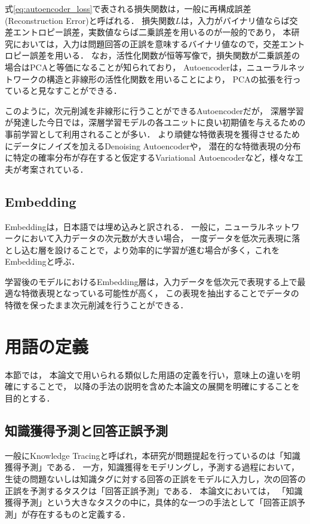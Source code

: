 式\ref{eq:autoencoder_loss}で表される損失関数は，一般に再構成誤差(Reconstruction Error)と呼ばれる．
損失関数$L$は，入力がバイナリ値ならば交差エントロピー誤差，実数値ならば二乗誤差を用いるのが一般的であり，%
本研究においては，入力は問題回答の正誤を意味するバイナリ値なので，交差エントロピー誤差を用いる．
なお，活性化関数が恒等写像で，損失関数が二乗誤差の場合はPCAと等価になることが知られており\cite{baldi1989neural}，
Autoencoderは，ニューラルネットワークの構造と非線形の活性化関数を用いることにより，
PCAの拡張を行っていると見なすことができる．

このように，次元削減を非線形に行うことができるAutoencoderだが，
深層学習が発達した今日では，深層学習モデルの各ユニットに良い初期値を与えるための事前学習として利用されることが多い\cite{erhan2010does}．
より頑健な特徴表現を獲得させるためにデータにノイズを加えるDenoising Autoencoder\cite{vincent2008extracting}や，
潜在的な特徴表現の分布に特定の確率分布が存在すると仮定するVariational Autoencoder\cite{kingma2014semi}など，様々な工夫が考案されている．



\subsection{Embedding}
Embeddingは，日本語では埋め込みと訳される．
一般に，ニューラルネットワークにおいて入力データの次元数が大きい場合，
一度データを低次元表現に落とし込む層を設けることで，より効率的に学習が進む場合が多く，これをEmbeddingと呼ぶ．

学習後のモデルにおけるEmbedding層は，入力データを低次元で表現する上で最適な特徴表現となっている可能性が高く，
この表現を抽出することでデータの特徴を保ったまま次元削減を行うことができる．


\vvspace


\section{用語の定義}
本節では，
本論文で用いられる類似した用語の定義を行い，意味上の違いを明確にすることで，
以降の手法の説明を含めた本論文の展開を明確にすることを目的とする．

\subsection{知識獲得予測と回答正誤予測}
一般にKnowledge Tracingと呼ばれ，本研究が問題提起を行っているのは「知識獲得予測」である．
一方，知識獲得をモデリングし，予測する過程において，
生徒の問題ないしは知識タグに対する回答の正誤をモデルに入力し，次の回答の正誤を予測するタスクは「回答正誤予測」である．
本論文においては，
「知識獲得予測」という大きなタスクの中に，具体的な一つの手法として「回答正誤予測」が存在するものと定義する．


